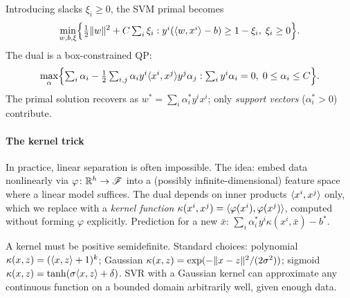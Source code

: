Introducing slacks $\xi_i \geq 0$, the SVM primal becomes
\begin{equation}\label{eq:svm-primal-slack}
	\min_{w, b, \xi}\Bigl\{\tfrac{1}{2}\lVert w\rVert^2 + C\textstyle\sum_i \xi_i : y^i(\langle w, x^i\rangle - b) \geq 1 - \xi_i,\; \xi_i \geq 0\Bigr\}.
\end{equation}
The dual is a box-constrained QP:
\begin{equation}\label{eq:svm-dual}
	\max_\alpha\Bigl\{\textstyle\sum_i \alpha_i - \frac{1}{2}\sum_{i,j} \alpha_i y^i \langle x^i, x^j\rangle y^j \alpha_j : \sum_i y^i \alpha_i = 0,\; 0 \leq \alpha_i \leq C\Bigr\}.
\end{equation}
The primal solution recovers as $w^* = \sum_i \alpha_i^* y^i x^i$; only \emph{support vectors} ($\alpha_i^* > 0$) contribute.

\paragraph{The kernel trick}

In practice, linear separation is often impossible.
The idea: embed data nonlinearly via $\varphi \colon \mathbb{R}^h \to \mathcal{F}$ into a (possibly infinite-dimensional) feature space where a linear model suffices.
The dual depends on inner products $\langle x^i, x^j\rangle$ only, which we replace with a \emph{kernel function} $\kappa(x^i, x^j) = \langle\varphi(x^i), \varphi(x^j)\rangle$, computed without forming $\varphi$ explicitly.
Prediction for a new $\bar{x}$: $\sum_i \alpha_i^* y^i \kappa(x^i, \bar{x}) - b^*$.

A kernel must be positive semidefinite.
Standard choices: polynomial $\kappa(x, z) = (\langle x, z\rangle + 1)^k$; Gaussian $\kappa(x, z) = \exp(-\lVert x-z\rVert^2 / (2\sigma^2))$; sigmoid $\kappa(x, z) = \tanh(\sigma\langle x, z\rangle + \delta)$.
SVR with a Gaussian kernel can approximate any continuous function on a bounded domain arbitrarily well, given enough data.
